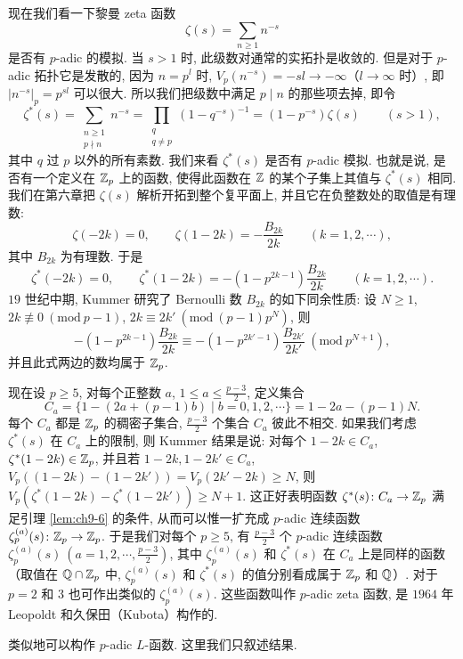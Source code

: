 现在我们看一下黎曼 zeta 函数
\[
  \zeta(s)=\sum_{n\geqslant 1}n^{-s}
\]
是否有 $p$-adic 的模拟. 当 $s>1$ 时, 此级数对通常的实拓扑是收敛的. 但是对于 $p$-adic 拓扑它是发散的, 因为 $n=p^l$ 时, $V_p(n^{-s})=-sl\to-\infty$（$l\to\infty$ 时）, 即 $|n^{-s}|_p=p^{sl}$ 可以很大. 所以我们把级数中满足 $p\mid n$ 的那些项去掉, 即令
\[
  \zeta^*(s)=\sum_{\substack{n\geqslant 1\\ p\nmid n}}n^{-s}
  =\prod_{\substack{q\\ q\neq p}}(1-q^{-s})^{-1}
  =(1-p^{-s})\zeta(s)\qquad(s>1),
\]
其中 $q$ 过 $p$ 以外的所有素数. 我们来看 $\zeta^*(s)$ 是否有 $p$-adic 模拟. 也就是说, 是否有一个定义在 $\mathbb{Z}_p$ 上的函数, 使得此函数在 $\mathbb{Z}$ 的某个子集上其值与 $\zeta^*(s)$ 相同. 我们在第六章把 $\zeta(s)$ 解析开拓到整个复平面上, 并且它在负整数处的取值是有理数:
\[
  \zeta(-2k)=0,\qquad\zeta(1-2k)=-\frac{B_{2k}}{2k}\qquad(k=1,2,\cdots),
\]
其中 $B_{2k}$ 为有理数. 于是
\[
  \zeta^*(-2k)=0,\qquad
  \zeta^*(1-2k)=-(1-p^{2k-1})\frac{B_{2k}}{2k}\qquad(k=1,2,\cdots).
\]
$19$ 世纪中期, Kummer 研究了 Bernoulli 数 $B_{2k}$ 的如下同余性质: 设 $N\geqslant 1$, $2k\not\equiv 0\ (\mathrm{mod}\ p-1)$, $2k\equiv 2k'\ (\mathrm{mod}\ (p-1)p^N)$, 则
\[
  -(1-p^{2k-1})\frac{B_{2k}}{2k}
  \equiv-(1-p^{2k'-1})\frac{B_{2k'}}{2k'}\ (\mathrm{mod}\ p^{N+1}),
\]
并且此式两边的数均属于 $\mathbb{Z}_p$.

现在设 $p\geqslant 5$, 对每个正整数 $a$, $1\leqslant a\leqslant\frac{p-3}{2}$, 定义集合
\[
  C_a=\{1-(2a+(p-1)b)\mid b=0,1,2,\cdots\}=1-2a-(p-1)N.
\]
每个 $C_a$ 都是 $\mathbb{Z}_p$ 的稠密子集合, $\frac{p-3}{2}$ 个集合 $C_a$ 彼此不相交. 如果我们考虑 $\zeta^*(s)$ 在 $C_a$ 上的限制, 则 Kummer 结果是说: 对每个 $1-2k\in C_a$, $\zeta^*(1-2k)\in\mathbb{Z}_p$, 并且若 $1-2k,1-2k'\in C_a$, $V_p((1-2k)-(1-2k'))=V_p(2k'-2k)\geqslant N$, 则 $V_p(\zeta^*(1-2k)-\zeta^*(1-2k'))\geqslant N+1$. 这正好表明函数 $\zeta^*(s)\colon C_a\to\mathbb{Z}_p$ 满足引理 \ref{lem:ch9-6} 的条件, 从而可以惟一扩充成 $p$-adic 连续函数 $\zeta_p^{(a)}(s)\colon\mathbb{Z}_p\to\mathbb{Z}_p$. 于是我们对每个 $p\geqslant 5$, 有 $\frac{p-3}{2}$ 个 $p$-adic 连续函数 $\zeta_p^{(a)}(s)\ (a=1,2,\cdots,\frac{p-3}{2})$, 其中 $\zeta_p^{(a)}(s)$ 和 $\zeta^*(s)$ 在 $C_a$ 上是同样的函数（取值在 $\mathbb{Q}\cap\mathbb{Z}_p$ 中, $\zeta_p^{(a)}(s)$ 和 $\zeta^*(s)$ 的值分别看成属于 $\mathbb{Z}_p$ 和 $\mathbb{Q}$）. 对于 $p=2$ 和 $3$ 也可作出类似的 $\zeta_p^{(a)}(s)$. 这些函数叫作 $p$-adic zeta 函数, 是 $1964$ 年 Leopoldt 和久保田（Kubota）构作的.

类似地可以构作 $p$-adic $L$-函数. 这里我们只叙述结果.

